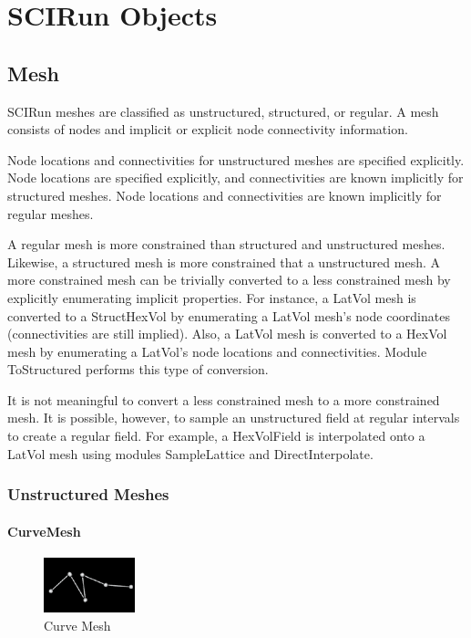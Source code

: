 \documentclass[fleqn,12pt,openany]{book}
\begin{document}
\chapter{SCIRun Objects}

\section{Mesh}

SCIRun meshes are classified as unstructured, structured, or regular.
A mesh consists of nodes and implicit or explicit node connectivity information.


Node locations and connectivities for unstructured meshes are specified explicitly.
Node locations are specified explicitly, and connectivities are known implicitly for structured meshes.
Node locations and connectivities are known implicitly for regular meshes.

A regular mesh is more constrained than structured and unstructured meshes.
Likewise, a structured mesh is more constrained that a unstructured mesh.
A more constrained mesh can be trivially converted to a less constrained mesh by explicitly enumerating implicit properties.
For instance, a LatVol mesh is converted to a StructHexVol by enumerating a LatVol mesh's node coordinates (connectivities are still implied).
Also, a LatVol mesh is converted to a HexVol mesh by enumerating a LatVol's node locations and connectivities.
Module ToStructured performs this type of conversion.

It is not meaningful to convert a less constrained mesh to a more constrained mesh.
It is possible, however, to sample an unstructured field at regular intervals to create a regular field.
For example, a HexVolField is interpolated onto a LatVol mesh using modules SampleLattice and DirectInterpolate.

\subsection{Unstructured Meshes}

\subsubsection{CurveMesh}
\begin{figure}[H]\label{curvemesh}
\includegraphics{UserGuide_figures/CurveMesh.png}
\caption{Curve Mesh}
\end{figure}
\end{document}

